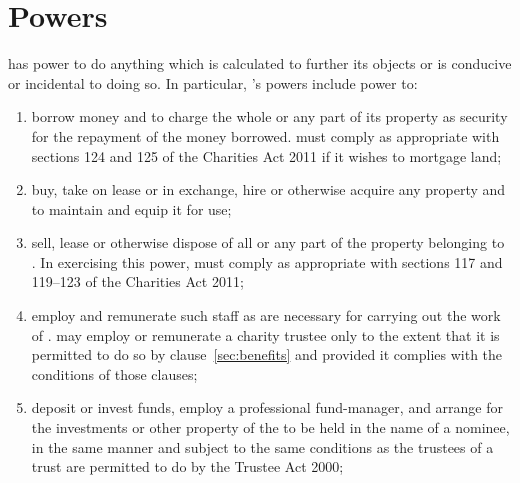 \section{Powers}\label{sec:powers}
\shortname{} has power to do anything which is calculated to further its objects or is conducive or incidental to doing so. In particular, \shortname{}'s powers include power to:
\begin{enumerate}
    \item borrow money and to charge the whole or any part of its property as security for the repayment of the money borrowed. \shortname{} must comply as appropriate with sections 124 and 125 of the Charities Act 2011 if it wishes to mortgage land;
    \item buy, take on lease or in exchange, hire or otherwise acquire any property and to maintain and equip it for use;
    \item sell, lease or otherwise dispose of all or any part of the property belonging to \shortname{}. In exercising this power, \shortname{} must comply as appropriate with sections 117 and 119--123 of the Charities Act 2011;
    \item employ and remunerate such staff as are necessary for carrying out the work of \shortname{}. \shortname{} may employ or remunerate a charity trustee only to the extent that it is permitted to do so by clause~\ref{sec:benefits} and provided it complies with the conditions of those clauses;
    \item deposit or invest funds, employ a professional fund-manager, and arrange for the investments or other property of the
    \shortname{} to be held in the name of a nominee, in the same manner and subject to the same conditions as the trustees of a trust are permitted to do by the Trustee Act 2000;
 \end{enumerate}
